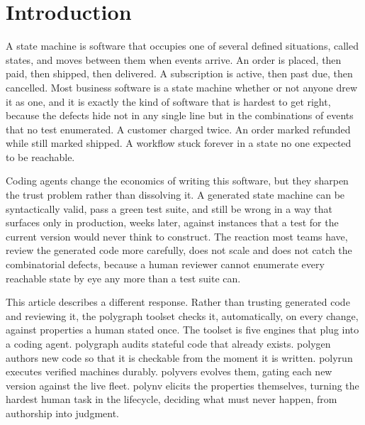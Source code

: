 \documentclass[11pt]{article}
\newcommand{\tool}[1]{\textsf{#1}}
\begin{document}
\begin{abstract}
We situate the approach against current durable-execution practice, in which
worker versioning determines which code executes an instance but not whether
that code preserves the invariants of the state it inherits. All results are
bounded: checking is exhaustive only over declared finite domains, is relative to
human-stated invariants, and is confined to the declared projection. These
limitations are stated where they arise. A glossary defines all technical terms.
\end{abstract}

\tableofcontents

\section{Introduction}

A state machine is software that occupies one of several defined situations,
called states, and moves between them when events arrive. An order is placed,
then paid, then shipped, then delivered. A subscription is active, then past
due, then cancelled. Most business software is a state machine whether or not
anyone drew it as one, and it is exactly the kind of software that is hardest
to get right, because the defects hide not in any single line but in the
combinations of events that no test enumerated. A customer charged twice. An
order marked refunded while still marked shipped. A workflow stuck forever in
a state no one expected to be reachable.

Coding agents change the economics of writing this software, but they sharpen
the trust problem rather than dissolving it. A generated state machine can be
syntactically valid, pass a green test suite, and still be wrong in a way that
surfaces only in production, weeks later, against instances that a test for
the current version would never think to construct. The reaction most teams
have, review the generated code more carefully, does not scale and does not
catch the combinatorial defects, because a human reviewer cannot enumerate
every reachable state by eye any more than a test suite can.

This article describes a different response. Rather than trusting generated
code and reviewing it, the \tool{polygraph} toolset checks it, automatically,
on every change, against properties a human stated once. The toolset is five
engines that plug into a coding agent. \tool{polygraph} audits stateful code
that already exists. \tool{polygen} authors new code so that it is checkable
from the moment it is written. \tool{polyrun} executes verified machines
durably. \tool{polyvers} evolves them, gating each new version against the
live fleet. \tool{polynv} elicits the properties themselves, turning the
hardest human task in the lifecycle, deciding what must never happen, from
authorship into judgment.
\end{document}
